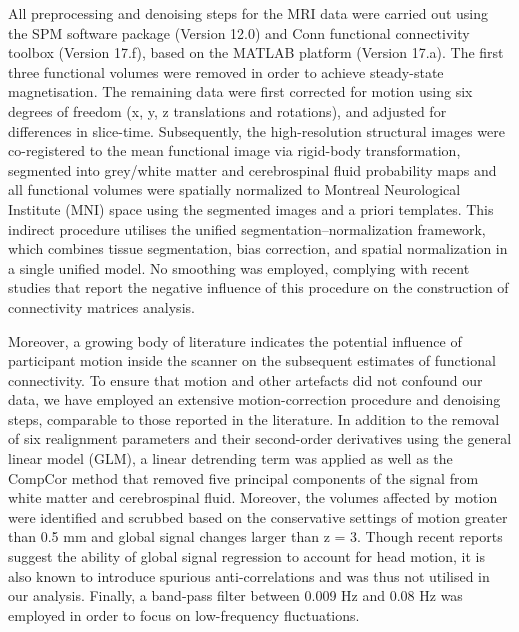 All preprocessing and denoising steps for the MRI data were carried out using the SPM software package (Version 12.0) and Conn functional connectivity toolbox (Version 17.f), based on the MATLAB platform (Version 17.a). The first three functional volumes were removed in order to achieve steady-state magnetisation. The remaining data were first corrected for motion using six degrees of freedom (x, y, z translations and rotations), and adjusted for differences in slice-time. Subsequently, the high-resolution structural images were co-registered to the mean functional image via rigid-body transformation, segmented into grey/white matter and cerebrospinal fluid probability maps and all functional volumes were spatially normalized to Montreal Neurological Institute (MNI) space using the segmented images and a priori templates. This indirect procedure utilises the unified segmentation–normalization framework, which combines tissue segmentation, bias correction, and spatial normalization in a single unified model. No smoothing was employed, complying with recent studies that report the negative influence of this procedure on the construction of connectivity matrices analysis.

Moreover, a growing body of literature indicates the potential influence of participant motion inside the scanner on the subsequent estimates of functional connectivity. To ensure that motion and other artefacts did not confound our data, we have employed an extensive motion-correction procedure and denoising steps, comparable to those reported in the literature. In addition to the removal of six realignment parameters and their second-order derivatives using the general linear model (GLM), a linear detrending term was applied as well as the CompCor method that removed five principal components of the signal from white matter and cerebrospinal fluid. Moreover, the volumes affected by motion were identified and scrubbed based on the conservative settings of motion greater than 0.5 mm and global signal changes larger than z = 3. Though recent reports suggest the ability of global signal regression to account for head motion, it is also known to introduce spurious anti-correlations and was thus not utilised in our analysis. Finally, a band-pass filter between 0.009 Hz and 0.08 Hz was employed in order to focus on low-frequency fluctuations.

